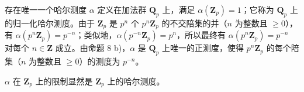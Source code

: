 存在唯一一个哈尔测度 \(\alpha\) 定义在加法群 \(\mathbf{Q}_p\) 上，满足 \(\alpha(\mathbf{Z}_p) = 1\)；它称为 \(\mathbf{Q}_p\) 上的归一化哈尔测度。由于 \(\mathbf{Z}_p\) 是 \(p^n\) 个 \(p^n\mathbf{Z}_p\) 的不交陪集的并（\(n\) 为整数且 \(\geqslant 0\)），有 \(\alpha(p^n\mathbf{Z}_p) = p^{-n}\)；类似地，\(\alpha(p^{-n}\mathbf{Z}_p) = p^n\)，所以最终有 \(\alpha(p^n\mathbf{Z}_p) = p^{-n}\) 对每个 \(n \in \mathbf{Z}\) 成立。由命题 8 b)，\(\alpha\) 是 \(\mathbf{Q}_p\) 上唯一的正测度，使得 \(p^n\mathbf{Z}_p\) 的每个陪集（\(n\) 为整数且 \(\geqslant 0\)）的测度为 \(p^{-n}\)。

\(\alpha\) 在 \(\mathbf{Z}_p\) 上的限制显然是 \(\mathbf{Z}_p\) 上的哈尔测度。

